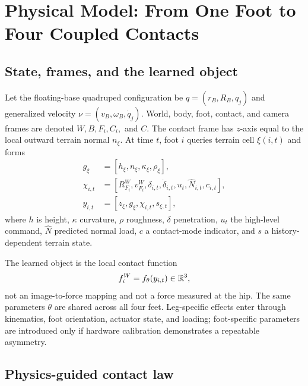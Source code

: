 \section{Physical Model: From One Foot to Four Coupled Contacts}
\label{sec:physics}

\subsection{State, frames, and the learned object}

Let the floating-base quadruped configuration be $q=(r_B,R_B,q_j)$ and generalized velocity $\nu=(v_B,\omega_B,\dot q_j)$. World, body, foot, contact, and camera frames are denoted $W,B,F_i,C_i,$ and $C$. The contact frame has $z$-axis equal to the local outward terrain normal $n_\xi$. At time $t$, foot $i$ queries terrain cell $\xi(i,t)$ and forms
\begin{align}
g_\xi &= [h_\xi,n_\xi,\kappa_\xi,\rho_\xi], \\
\chi_{i,t} &= [R^W_{F_i},v^W_{F_i},\delta_{i,t},\dot\delta_{i,t},u_t,\hat N_{i,t},c_{i,t}], \\
y_{i,t} &= [z_\xi,g_\xi,\chi_{i,t},s_{\xi,t}],
\label{eq:contact_input}
\end{align}
where $h$ is height, $\kappa$ curvature, $\rho$ roughness, $\delta$ penetration, $u_t$ the high-level command, $\hat N$ predicted normal load, $c$ a contact-mode indicator, and $s$ a history-dependent terrain state.

The learned object is the local contact function
\begin{equation}
f_i^W=f_\theta(y_{i,t})\in\mathbb{R}^3,
\label{eq:learned_contact}
\end{equation}
not an image-to-force mapping and not a force measured at the hip. The same parameters $\theta$ are shared across all four feet. Leg-specific effects enter through kinematics, foot orientation, actuator state, and loading; foot-specific parameters are introduced only if hardware calibration demonstrates a repeatable asymmetry.

\subsection{Physics-guided contact law}

